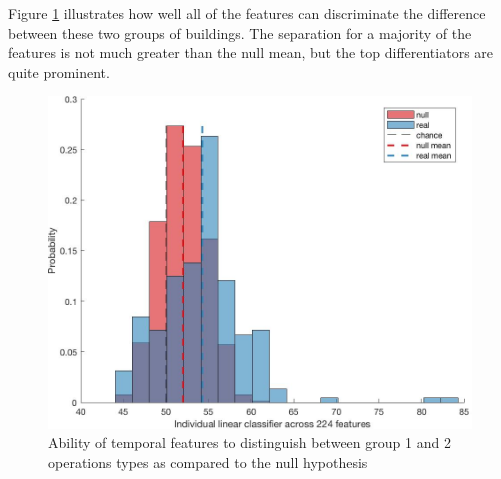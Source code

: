 Figure \ref{sec:operationstypes_nullhypth} illustrates how well all of the features can discriminate the difference between these two groups of buildings. The separation for a majority of the features is not much greater than the null mean, but the top differentiators are quite prominent.

\begin{figure}[ht!]
\begin{center}
\includegraphics[width=0.7\columnwidth]{figures/Output_Group1vsGroup2_Dist/Output_Group1vsGroup2_Dist}
\caption{{Ability of temporal features to distinguish between group 1 and 2 operations types as compared to the null hypothesis
\label{sec:operationstypes_nullhypth}%
}}
\end{center}
\end{figure}





